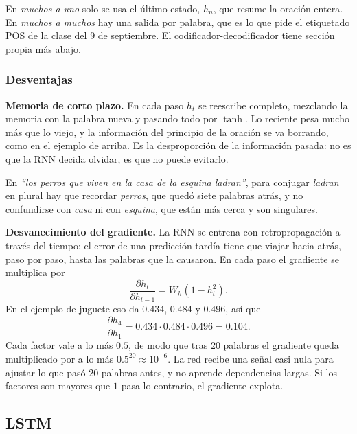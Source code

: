 \documentclass[11pt,letterpaper]{article}
\begin{document}
En \textit{muchos a uno} solo se usa el último estado, $h_n$, que
resume la oración entera. En \textit{muchos a muchos} hay una salida
por palabra, que es lo que pide el etiquetado POS de la clase del $9$
de septiembre. El codificador-decodificador tiene sección propia más
abajo.

\subsubsection*{Desventajas}

\textbf{Memoria de corto plazo.} En cada paso $h_t$ se reescribe
completo, mezclando la memoria con la palabra nueva y pasando todo por
$\tanh$. Lo reciente pesa mucho más que lo viejo, y la información del
principio de la oración se va borrando, como en el ejemplo de arriba.
Es la desproporción de la información pasada: no es que la RNN decida
olvidar, es que no puede evitarlo.

\begin{ejemplo}
    En \textit{``los perros que viven en la casa de la esquina
    ladran''}, para conjugar \textit{ladran} en plural hay que recordar
    \textit{perros}, que quedó siete palabras atrás, y no confundirse
    con \textit{casa} ni con \textit{esquina}, que están más cerca y son
    singulares.
\end{ejemplo}

\textbf{Desvanecimiento del gradiente.} La RNN se entrena con
retropropagación a través del tiempo: el error de una predicción
tardía tiene que viajar hacia atrás, paso por paso, hasta las palabras
que la causaron. En cada paso el gradiente se multiplica por
\[
    \frac{\partial h_t}{\partial h_{t-1}}
    = W_h \left(1 - h_t^2\right) .
\]
En el ejemplo de juguete eso da $0.434$, $0.484$ y $0.496$, así que
\[
    \frac{\partial h_4}{\partial h_1}
    = 0.434 \cdot 0.484 \cdot 0.496 = 0.104 .
\]
Cada factor vale a lo más $0.5$, de modo que tras $20$ palabras el
gradiente queda multiplicado por a lo más $0.5^{20} \approx 10^{-6}$.
La red recibe una señal casi nula para ajustar lo que pasó $20$
palabras antes, y no aprende dependencias largas. Si los factores son
mayores que $1$ pasa lo contrario, el gradiente explota.


\subsection*{LSTM}
\end{document}

